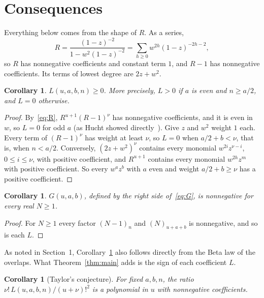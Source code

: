 \documentclass[11pt]{amsart}
\newtheorem{corollary}[theorem]{Corollary}
\theoremstyle{remark}
\begin{document}
\section{Consequences}

Everything below comes from the shape of $R$. As a series,
\begin{equation}\label{eq:R}
 R=\frac{(1-z)^{-2}}{1-w^2(1-z)^{-2}}=\sum_{h\ge0}w^{2h}(1-z)^{-2h-2},
\end{equation}
so $R$ has nonnegative coefficients and constant term $1$, and $R-1$ has nonnegative coefficients. Its terms of lowest degree are $2z+w^2$.

\begin{corollary}\label{cor:pos}
$L(u,a,b,n)\ge0$. More precisely, $L>0$ if $a$ is even and $n\ge a/2$, and $L=0$ otherwise.
\end{corollary}

\begin{proof}
By~\eqref{eq:R}, $R^{u+1}(R-1)^\nu$ has nonnegative coefficients, and it is even in $w$, so $L=0$ for odd $a$ (as Hucht showed directly~\cite{MO}). Give $z$ and $w^2$ weight $1$ each. Every term of $(R-1)^\nu$ has weight at least $\nu$, so $L=0$ when $a/2+b<\nu$, that is, when $n<a/2$. Conversely, $(2z+w^2)^\nu$ contains every monomial $w^{2i}z^{\nu-i}$, $0\le i\le\nu$, with positive coefficient, and $R^{u+1}$ contains every monomial $w^{2h}z^m$ with positive coefficient. So every $w^az^b$ with $a$ even and weight $a/2+b\ge\nu$ has a positive coefficient.
\end{proof}

\begin{corollary}\label{cor:G}
$G(u,a,b)$, defined by the right side of~\eqref{eq:G}, is nonnegative for every real $N\ge1$.
\end{corollary}

\begin{proof}
For $N\ge1$ every factor $(N-1)_n$ and $(N)_{u+a+b}$ is nonnegative, and so is each $L$.
\end{proof}

As noted in Section~1, Corollary~\ref{cor:G} also follows directly from the Beta law of the overlaps. What Theorem~\ref{thm:main} adds is the sign of each coefficient $L$.

\begin{corollary}[Taylor's conjecture]\label{cor:taylor}
For fixed $a,b,n$, the ratio $\nu!\,L(u,a,b,n)/(u+\nu)!^2$ is a polynomial in $u$ with nonnegative coefficients.
\end{corollary}
\end{document}
